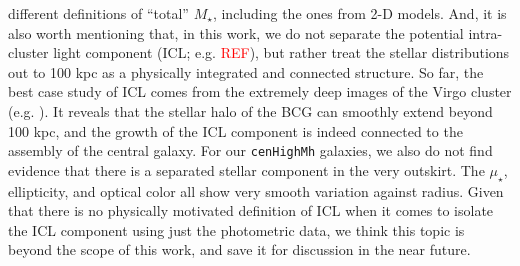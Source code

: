 \documentclass{emulateapj}
\def\rbcg{\texttt{cenHighMh}}
\def\mstar{{$M_{\star}$}}
\def\mden{{$\mu_{\star}$}}
\newcommand{\addref}{{\textcolor{red}{REF}}}
\begin{document}
\begin{CJK*}{UTF8}{gbsn}
{    different definitions of ``total'' \mstar{}, including the ones from 2-D models.  
    And, it is also worth mentioning that, in this work, we do not separate the 
    potential intra-cluster light component (ICL; e.g. \addref{}), but rather treat 
    the stellar distributions out to 100 kpc as a physically integrated and connected 
    structure.  
    So far, the best case study of ICL comes from the extremely deep images of the 
    Virgo cluster (e.g. \citealt{Mihos2016}). 
    It reveals that the stellar halo of the BCG can smoothly extend beyond 100 kpc, 
    and the growth of the ICL component is indeed connected to the assembly of the 
    central galaxy.
    For our \rbcg{} galaxies, we also do not find evidence that there is a 
    separated stellar component in the very outskirt. 
    The \mden{}, ellipticity, and optical color all show very smooth variation 
    against radius.  
    Given that there is no physically motivated definition of ICL when it comes
    to isolate the ICL component using just the photometric data, we think this topic 
    is beyond the scope of this work, and save it for discussion in the near future.  
    }
       

\end{CJK*}
\end{document}
